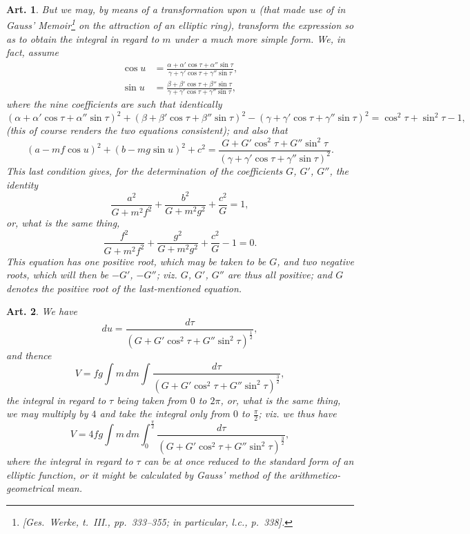 \documentclass[12pt,a4paper]{article}
\theoremstyle{cayley}
\newtheorem{art}{Art.}[section]
\begin{document}
\begin{art}
But we may, by means of a transformation upon $u$ (that made use of in Gauss' Memoir\footnote{[Ges.\ Werke, t.~III., pp.~333--355; in particular, l.c., p.~338].} on the attraction of an elliptic ring), transform the expression so as to obtain the integral in regard to $m$ under a much more simple form. We, in fact, assume
\begin{align*}
\cos u &= \frac{\alpha + \alpha'\cos\tau + \alpha''\sin\tau}{\gamma + \gamma'\cos\tau + \gamma''\sin\tau}, \\
\sin u &= \frac{\beta + \beta'\cos\tau + \beta''\sin\tau}{\gamma + \gamma'\cos\tau + \gamma''\sin\tau},
\end{align*}
where the nine coefficients are such that identically
\[
(\alpha + \alpha'\cos\tau + \alpha''\sin\tau)^2 + (\beta + \beta'\cos\tau + \beta''\sin\tau)^2 - (\gamma + \gamma'\cos\tau + \gamma''\sin\tau)^2 = \cos^2\tau + \sin^2\tau - 1,
\]
(this of course renders the two equations consistent); and also that
\[
(a - mf\cos u)^2 + (b - mg\sin u)^2 + c^2 = \frac{G + G'\cos^2\tau + G''\sin^2\tau}{(\gamma + \gamma'\cos\tau + \gamma''\sin\tau)^2}.
\]
This last condition gives, for the determination of the coefficients $G$, $G'$, $G''$, the identity
\[
\frac{a^2}{G + m^2f^2} + \frac{b^2}{G + m^2g^2} + \frac{c^2}{G} = 1,
\]
or, what is the same thing,
\[
\frac{f^2}{G + m^2f^2} + \frac{g^2}{G + m^2g^2} + \frac{c^2}{G} - 1 = 0.
\]
This equation has one positive root, which may be taken to be $G$, and two negative roots, which will then be $-G'$, $-G''$; viz. $G$, $G'$, $G''$ are thus all positive; and $G$ denotes the positive root of the last-mentioned equation.
\end{art}

\begin{art}
We have
\[ du = \frac{d\tau}{(G + G'\cos^2\tau + G''\sin^2\tau)^{\frac{1}{2}}}, \]
and thence
\[
V = fg\int m\,dm\int \frac{d\tau}{(G + G'\cos^2\tau + G''\sin^2\tau)^{\frac{3}{2}}},
\]
the integral in regard to $\tau$ being taken from $0$ to $2\pi$, or, what is the same thing, we may multiply by $4$ and take the integral only from $0$ to $\frac{\pi}{2}$; viz. we thus have
\[
V = 4fg\int m\,dm\int_0^{\frac{\pi}{2}} \frac{d\tau}{(G + G'\cos^2\tau + G''\sin^2\tau)^{\frac{3}{2}}},
\]
where the integral in regard to $\tau$ can be at once reduced to the standard form of an elliptic function, or it might be calculated by Gauss' method of the arithmetico-geometrical mean.
\end{art}
\end{document}
